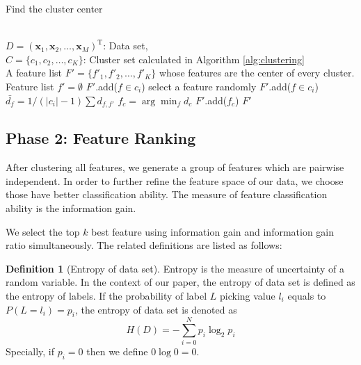 \documentclass{ieeeaccess}
\theoremstyle{definition}
\newtheorem{defn}{Definition}
\begin{document}
\begin{algorithm}
    \caption{Find the cluster center}
    \label{alg:find-cluster-center}
    \begin{algorithmic}[1]
    \REQUIRE ~~\\
        $D=(\bm{x}_1,\bm{x}_2,\ldots,\bm{x}_M)^\text{T}$: Data set, \\
        $C=\{c_1, c_2, \ldots, c_K\}$: Cluster set calculated in Algorithm \ref{alg:clustering}
    \ENSURE ~~\\
        A feature list $F'=\{f'_1, f'_2, \ldots, f'_K\}$ whose features are the center of every cluster.
    \STATE Feature list $f'=\emptyset$
            \STATE $F'$.add($f \in c_i$)
                \STATE select a feature randomly
                \STATE $F'$.add($f \in c_i$)
        \ELSE
                \STATE $\bar{d_f}=1/(|c_i|-1)\sum d_{f, f'}$
            \ENDFOR
            \STATE $f_c=\arg\min_f d_c$
            \STATE $F'$.add($f_c$)
        \ENDIF
    \ENDFOR
    \RETURN $F'$
    \end{algorithmic}
\end{algorithm}
        

\subsection{Phase 2: Feature Ranking}

After clustering all features, we generate a group of features which are pairwise independent. In order to further refine the feature space of our data, we choose those have better classification ability. The measure of feature classification ability is the information gain.

We select the top $k$ best feature using information gain and information gain ratio simultaneously. The related definitions are listed as follows:

\begin{defn}[Entropy of data set]
    Entropy\cite{Shannon1948} is the measure of uncertainty of a random variable. In the context of our paper, the entropy of data set is defined as the entropy of labels. If the probability of label $L$ picking value $l_i$ equals to $P(L=l_i)=p_i$, the entropy of data set is denoted as
\begin{equation}
    H(D) = -\sum_{i=0}^N p_i \log_2 p_i
\end{equation}
    Specially, if $p_i=0$ then we define $0\log0 = 0$.
\end{defn}
\end{document}
